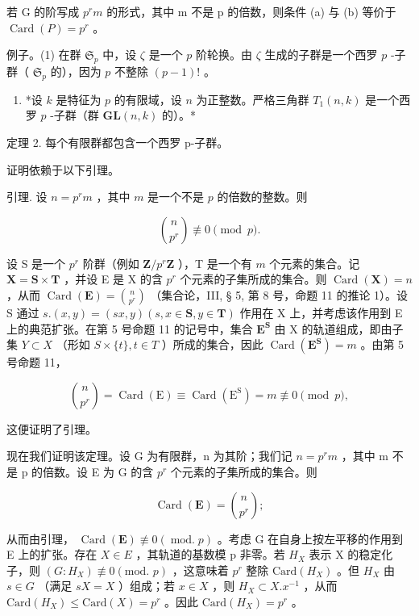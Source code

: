 若 G 的阶写成 \(p^{r}m\) 的形式，其中 m 不是 p 的倍数，则条件 (a) 与 (b) 等价于 \(\operatorname{Card}(P) = p^{r}\) 。

例子。(1) 在群 \(\mathfrak{S}_p\) 中，设 \(\zeta\) 是一个 \(p\) 阶轮换。由 \(\zeta\) 生成的子群是一个西罗 \(p\) -子群（ \(\mathfrak{S}_p\) 的），因为 \(p\) 不整除 \((p - 1)!\) 。

\begin{enumerate}
\def\labelenumi{(\arabic{enumi})}
\setcounter{enumi}{1}
\tightlist
\item
  *设 \(k\) 是特征为 \(p\) 的有限域，设 \(n\) 为正整数。严格三角群 \(T_1(n, k)\) 是一个西罗 \(p\) -子群（群 \(\mathbf{GL}(n, k)\) 的）。*
\end{enumerate}

定理 2. 每个有限群都包含一个西罗 p-子群。

证明依赖于以下引理。

引理. 设 \(n = p^r m\) ，其中 \(m\) 是一个不是 \(p\) 的倍数的整数。则

\[
\binom {n} {p ^ {r}} \not \equiv 0 \pmod {p}.
\]

设 S 是一个 \(p^r\) 阶群（例如 \(\mathbf{Z} / p^r\mathbf{Z}\) ），T 是一个有 \(m\) 个元素的集合。记 \(\mathbf{X} = \mathbf{S} \times \mathbf{T}\) ，并设 E 是 X 的含 \(p^r\) 个元素的子集所成的集合。则 \(\operatorname{Card}(\mathbf{X}) = n\) ，从而 \(\operatorname{Card}(\mathbf{E}) = \binom{n}{p^r}\) （集合论，III, § 5, 第 8 号，命题 11 的推论 1）。设 S 通过 \(s.(x,y) = (sx,y)(s,x \in \mathbf{S},y \in \mathbf{T})\) 作用在 X 上，并考虑该作用到 E 上的典范扩张。在第 5 号命题 11 的记号中，集合 \(\mathbf{E}^{\mathbf{S}}\) 由 X 的轨道组成，即由子集 \(Y \subset X\) （形如 \(S \times \{t\}, t \in T\) ）所成的集合，因此 \(\operatorname{Card}(\mathbf{E}^{\mathbf{S}}) = m\) 。由第 5 号命题 11，

\[
\binom {n} {p ^ {r}} = \operatorname{Card} (\mathrm{E}) \equiv \operatorname{Card} (\mathrm{E} ^ {\mathrm{S}}) = m \not \equiv 0 \pmod {p},
\]

这便证明了引理。

现在我们证明该定理。设 G 为有限群，n 为其阶；我们记 \(n = p^{r}m\) ，其中 m 不是 p 的倍数。设 E 为 G 的含 \(p^{r}\) 个元素的子集所成的集合。则

\[
\operatorname{Card} (\mathbf {E}) = \binom{n}{p ^ {r}};
\]

从而由引理， \(\operatorname{Card}(\mathbf{E}) \not\equiv 0 (\operatorname{mod.} p)\) 。考虑 G 在自身上按左平移的作用到 E 上的扩张。存在 \(X \in E\) ，其轨道的基数模 p 非零。若 \(H_{X}\) 表示 X 的稳定化子，则 \((G:H_{X}) \not\equiv 0 (\text{mod. } p)\) ，这意味着 \(p^{r}\) 整除 \(\text{Card}(H_{X})\) 。但 \(H_{X}\) 由 \(s \in G\) （满足 \(sX = X\) ）组成；若 \(x \in X\) ，则 \(H_{X} \subset X.x^{-1}\) ，从而 \(\text{Card}(H_{X}) \leqslant \text{Card}(X) = p^{r}\) 。因此 \(\text{Card}(H_{X}) = p^{r}\) 。

